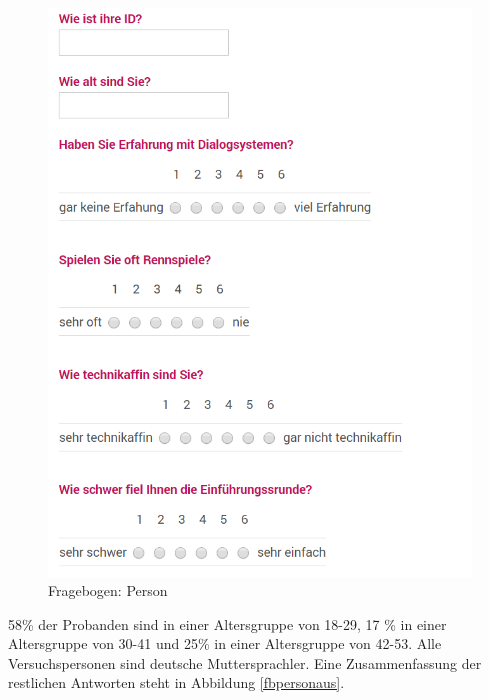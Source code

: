 \documentclass[12pt,a4paper]{scrartcl}
\begin{document}
\begin{figure}[H]
\begin{center}
\includegraphics[width=14cm]{fbperson.png}
\caption{Fragebogen: Person}
\label{fbperson}
\end{center}
\end{figure}
\newpage


58\% der Probanden sind in einer Altersgruppe von 18-29, 17 \% in einer Altersgruppe von 30-41 und 25\% in einer Altersgruppe von 42-53. Alle Versuchspersonen sind deutsche Muttersprachler. 
Eine Zusammenfassung der restlichen Antworten steht in Abbildung \ref{fbpersonaus}.
\end{document}
